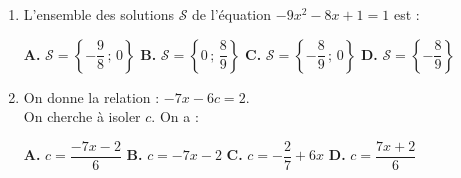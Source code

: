 \documentclass[a4paper,11pt]{article}
\begin{document}
\begin{seanceD}{}
\begin{enumerate}
\medskip
\begin{center}
\textbf{\textcolor{Couleur1}{A.}} une augmentation de $54\,\%$ \qquad \textbf{\textcolor{Couleur1}{B.}} une augmentation de $57\,\%$ \qquad \textbf{\textcolor{Couleur1}{C.}} une augmentation de $50\,\%$ \qquad \textbf{\textcolor{Couleur1}{D.}} une augmentation de $53\,\%$
\end{center}


\item L'ensemble des solutions $\mathscr{S}$ de l'équation  $-9x^2-8x+1=1$ est :

\medskip
\begin{center}
\textbf{\textcolor{Couleur1}{A.}} $\mathscr{S}=\left\{-\dfrac{9}{8}\,;\,0\right\}$ \qquad \textbf{\textcolor{Couleur1}{B.}} $\mathscr{S}=\left\{0\,;\,\dfrac{8}{9}\right\}$ \qquad \textbf{\textcolor{Couleur1}{C.}} $\mathscr{S}=\left\{-\dfrac{8}{9}\,;\,0\right\}$ \qquad \textbf{\textcolor{Couleur1}{D.}} $\mathscr{S}=\left\{-\dfrac{8}{9}\right\}$
\end{center}


\item On donne la relation  : $-7x-6c=2$.\\
        
         On cherche à isoler $c$. On a :

\medskip
\begin{center}
\textbf{\textcolor{Couleur1}{A.}} $c=\dfrac{-7x-2}{6}$ \qquad \textbf{\textcolor{Couleur1}{B.}} $c=-7x-2$ \qquad \textbf{\textcolor{Couleur1}{C.}} $c=-\dfrac{2}{7}+6x$ \qquad \textbf{\textcolor{Couleur1}{D.}} $c=\dfrac{7x+2}{6}$
\end{center}


\end{enumerate}

\end{seanceD}

\newpage
\end{document}
